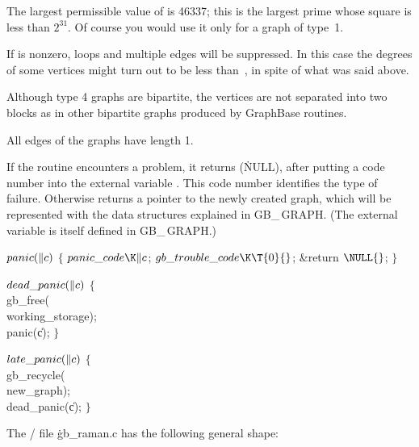 The largest permissible value of  is 46337; this is the largest
prime whose square is less than $2^{31}$. Of course you would use
it only for a graph of type~1.

If  is nonzero, loops and multiple edges will be suppressed.
In this case the degrees of some vertices might turn out to be less than~,
in spite of what was said above.

Although type 4 graphs are bipartite, the vertices
are not separated into two blocks as in other bipartite
graphs produced by GraphBase routines.

All edges of the graphs have length 1.

\fi

If the  routine encounters a problem, it returns \PB{$%
\NULL$}
(\.{NULL}), after putting a code number into the external variable
. This code number identifies the type of failure.
Otherwise  returns a pointer to the newly created graph, which
will be represented with the data structures explained in {\sc GB\_\,GRAPH}.
(The external variable  is itself defined in
{\sc GB\_\,GRAPH}.)

\Y\B\4\D$\\{panic}(\|c)$ \5
${}\{{}$\5
\1${}\\{panic\_code}\K\|c{}$;\5
${}\\{gb\_trouble\_code}\K\T{0}{}$;\5
\&{return} ${}\NULL{}$;\5
${}\}{}$\2\par
\B\4\D$\\{dead\_panic}(\|c)$ \6
${}\{{}$\5
\1\\{gb\_free}(\\{working\_storage});\5
\\{panic}(\|c);\5
${}\}{}$\2\par
\B\4\D$\\{late\_panic}(\|c)$ \6
${}\{{}$\5
\1\\{gb\_recycle}(\\{new\_graph});\5
\\{dead\_panic}(\|c);\5
${}\}{}$\2\par
\fi

The \CEE/ file \.{gb\_raman.c} has the following general shape:


